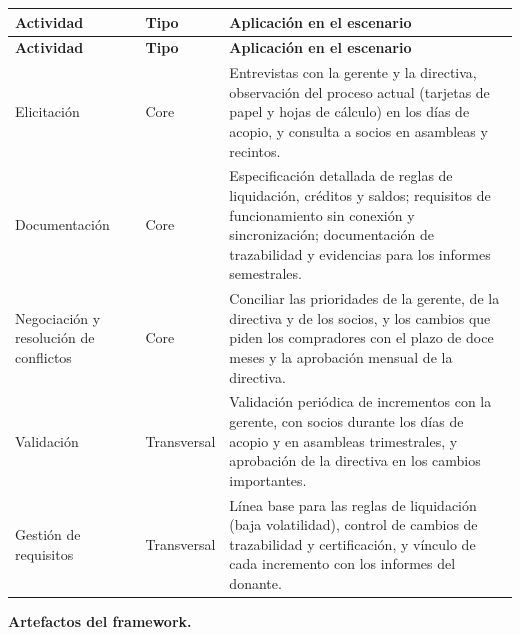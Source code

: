 {\small
\setlength{\tabcolsep}{4pt}
\renewcommand{\arraystretch}{1.3}
\begin{longtable}{
|>{\raggedright\arraybackslash}p{}
|>{\raggedright\arraybackslash}p{}
|>{\raggedright\arraybackslash}p{}|}
\hline
\textbf{Actividad} & \textbf{Tipo} & \textbf{Aplicación en el escenario} \\
\hline
\endfirsthead
\hline
\textbf{Actividad} & \textbf{Tipo} & \textbf{Aplicación en el escenario} \\
\hline
\endhead
Elicitación & Core & Entrevistas con la gerente y la directiva, observación del proceso actual (tarjetas de papel y hojas de cálculo) en los días de acopio, y consulta a socios en asambleas y recintos. \\
\hline
Documentación & Core & Especificación detallada de reglas de liquidación, créditos y saldos; requisitos de funcionamiento sin conexión y sincronización; documentación de trazabilidad y evidencias para los informes semestrales. \\
\hline
Negociación y resolución de conflictos & Core & Conciliar las prioridades de la gerente, de la directiva y de los socios, y los cambios que piden los compradores con el plazo de doce meses y la aprobación mensual de la directiva. \\
\hline
Validación & Transversal & Validación periódica de incrementos con la gerente, con socios durante los días de acopio y en asambleas trimestrales, y aprobación de la directiva en los cambios importantes. \\
\hline
Gestión de requisitos & Transversal & Línea base para las reglas de liquidación (baja volatilidad), control de cambios de trazabilidad y certificación, y vínculo de cada incremento con los informes del donante. \\
\hline
\end{longtable}
}

\textbf{Artefactos del framework.}

